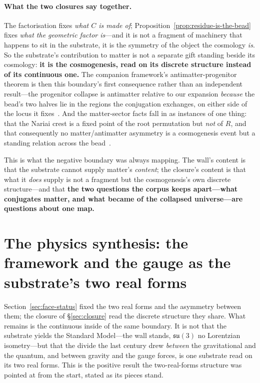 \documentclass[11pt]{article}
\theoremstyle{plain}
\theoremstyle{remark}
\newcommand{\su}{\mathfrak{su}}
\begin{document}
\paragraph{What the two closures say together.} The factorisation fixes \emph{what $C$ is made of}; Proposition~\ref{prop:residue-is-the-bead} fixes \emph{what the geometric factor is}---and it is not a fragment of machinery that happens to sit in the substrate, it is the symmetry of the object the cosmology \emph{is}. So the substrate's contribution to matter is not a separate gift standing beside its cosmology: \textbf{it is the cosmogenesis, read on its discrete structure instead of its continuous one.} The companion framework's antimatter-progenitor theorem is then this boundary's first consequence rather than an independent result---the progenitor collapse is antimatter relative to our expansion \emph{because} the bead's two halves lie in the regions the conjugation exchanges, on either side of the locus it fixes~\cite{JanzenCRframework}. And the matter-sector facts fall in as instances of one thing: that the Nariai crest is a fixed point of the root permutation but \emph{not} of $R$, and that consequently no matter/antimatter asymmetry is a cosmogenesis event but a standing relation across the bead~\cite{JanzenMatter}.

This is what the negative boundary was always mapping. The wall's content is that the substrate cannot supply matter's \emph{content}; the closure's content is that what it \emph{does} supply is not a fragment but the cosmogenesis's own discrete structure---and that \textbf{the two questions the corpus keeps apart---what conjugates matter, and what became of the collapsed universe---are questions about one map.}

\section{The physics synthesis: the framework and the gauge as the substrate's two real forms}\label{sec:synthesis}

Section~\ref{sec:face-status} fixed the two real forms and the asymmetry between them; the closure of \S\ref{sec:closure} read the discrete structure they share. What remains is the continuous inside of the same boundary. It is not that the substrate yields the Standard Model---the wall stands, $\su(3)$ no Lorentzian isometry---but that the divide the last century drew \emph{between} the gravitational and the quantum, and between gravity and the gauge forces, is one substrate read on its two real forms. This is the positive result the two-real-forms structure was pointed at from the start, stated as its pieces stand.
\end{document}
